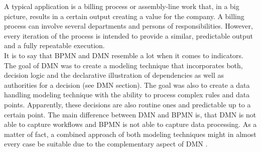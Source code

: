 A typical application is a billing process or assembly-line work that, in a big picture, results in a certain output creating a value for the company. A billing process can involve several departments and persons of responsibilities. However, every iteration of the process is intended to provide a similar, predictable output and a fully repeatable execution. \\
It is to say that BPMN and DMN resemble a lot when it comes to indicators. The goal of DMN was to create a modeling technique that incorporates both, decision logic and the declarative illustration of dependencies as well as authorities for a decision (see DMN section). The goal was also to create a data handling modeling technique with the ability to process complex rules and data points. Apparently, these decisions are also routine ones and predictable up to a certain point. The main difference between DMN and BPMN is, that DMN is not able to capture workflows and BPMN is not able to capture data processing. As a matter of fact, a combined approach of both modeling techniques might in almost every case be suitable due to the complementary aspect of DMN \cite{DMNspec2016}. 


